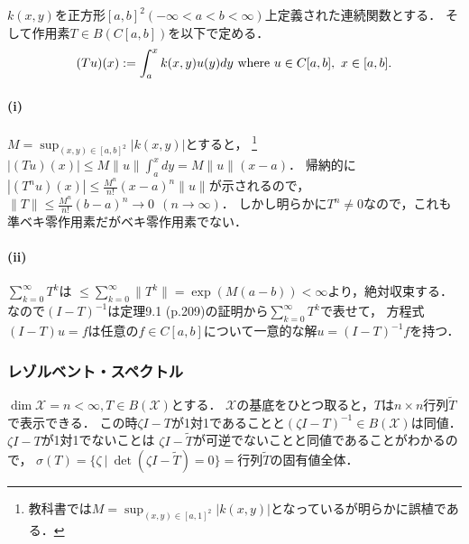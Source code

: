 \documentclass[a4j]{jsarticle}
\newcommand{\spX}{\mathscr{X}}
\begin{document}
        \begin{Example}[問題9.2, p.223]
            $k(x,y)$を正方形$[a,b]^2 (-\infty<a<b<\infty)$上定義された連続関数とする．
            そして作用素$T \in B(C[a,b])$を以下で定める．
            \[ (Tu)(x):=\int_a^x k(x,y)u(y) dy \text{ where } u \in C[a,b],~ x \in [a,b]. \]

            \paragraph{(i)}
            $M=\sup_{(x,y) \in [a,b]^2}|k(x,y)|$とすると，
            \footnote{教科書では$M=\sup_{(x,y) \in [a,1]^2}|k(x,y)|$となっているが明らかに誤植である．}
            $|(T u)(x)| \leq M \|u\| \int_a^x dy=M \|u\| (x-a)$．
            帰納的に$|(T^n u)(x)| \leq \frac{M^n}{n!} (x-a)^n \|u\|$が示されるので，
            $\|T\| \leq \frac{M^n}{n!} (b-a)^n \to 0 ~~(n \to \infty)$．
            しかし明らかに$T^n \neq 0$なので，これも準ベキ零作用素だがベキ零作用素でない．
            
            \paragraph{(ii)}
            $\sum_{k=0}^{\infty}T^k$は
            $\leq \sum_{k=0}^{\infty} \|T^k\|=\exp(M(a-b))<\infty$より，絶対収束する．
            なので$(I-T)^{-1}$は定理9.1 (p.209)の証明から$\sum_{k=0}^{\infty}T^k$で表せて，
            方程式$(I-T)u=f$は任意の$f \in C[a,b]$について一意的な解$u=(I-T)^{-1}f$を持つ．
        \end{Example}

        \subsubsection{レゾルベント・スペクトル}
        \begin{Example}[例9.15, p.217]
            $\dim \spX=n < \infty,T \in B(\spX)$とする．
            $\spX$の基底をひとつ取ると，$T$は$n \times n$行列$\tilde{T}$で表示できる．
            この時$\zeta I-T$が1対1であることと$(\zeta I-T)^{-1} \in B(\spX)$は同値．
            $\zeta I-T$が1対1でないことは
            $\zeta I-\tilde{T}$が可逆でないことと同値であることがわかるので，
            $\sigma(T)=\{\zeta ~|~ \det(\zeta I-\tilde{T})=0 \}=\text{行列$\tilde{T}$の固有値全体．}$
        \end{Example}
\end{document}
